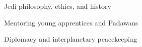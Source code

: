 \item Jedi philosophy, ethics, and history
\item Mentoring young apprentices and Padawans
\item Diplomacy and interplanetary peacekeeping